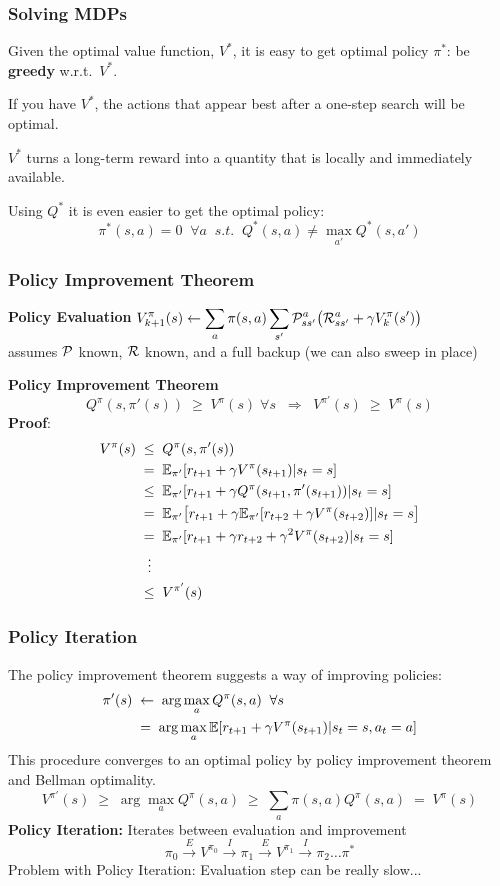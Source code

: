 \begin{frame}
\frametitle{Solving MDPs}

Given the optimal value function, $V^*$, it is easy to get optimal
policy $\pi^*$: be {\bf greedy} w.r.t.\ $V^*$.

If you have $V^*$, the actions that appear best after a  one-step
search will be optimal.

$V^*$ turns a long-term reward into a quantity that is locally and
immediately available.

Using $Q^*$ it is even easier to get the optimal policy:
\[
\pi^*(s,a) = 0 \;\; \forall a \;\; s.t. \;\; Q^*(s,a) \neq \max_{a'} Q^*(s,a')
\]
\end{frame}

\begin{frame}
\frametitle{Policy Improvement Theorem}

{\bf Policy Evaluation} \hfill $ \displaystyle
V_{k+1}^\pi(s) \leftarrow \sum_a \pi(s,a) \sum_{s'} {\mathcal P}_{ss'}^a
\big({\mathcal R}_{ss'}^a + \gamma V_k^\pi(s') \big)$ \hfill\\
assumes ${\mathcal P}$ known, ${\mathcal R}$ known, and a full backup (we can also sweep in
place) \vspace{0.2in}

{\bf Policy Improvement Theorem}
\[
Q^\pi(s,\pi'(s))\;\ge\;V^\pi(s)\;\forall s\;\;\Longrightarrow\;\;V^{\pi'}(s)
\;\ge\;V^{\pi}(s) 
\]
{\bf Proof}: 
\vspace*{-3ex}
\[
\begin{split} 
V^{\pi}(s)\;&\le\;Q^\pi(s,\pi'(s))\\
&=\;\mathbb{E}_{\pi'}[r_{t+1} + \gamma V^\pi(s_{t+1})|s_t=s]\\
&\le\;\mathbb{E}_{\pi'}[r_{t+1} + \gamma Q^\pi(s_{t+1},\pi'(s_{t+1}))|s_t=s]\\
&=\;\mathbb{E}_{\pi'}\big[r_{t+1} + \gamma \mathbb{E}_{\pi'}[r_{t+2}+\gamma V^{\pi}(s_{t+2})]|s_t=s\big]\\
&=\;\mathbb{E}_{\pi'}[r_{t+1} + \gamma r_{t+2}+\gamma^2V^{\pi}(s_{t+2})|s_t=s]\\
&\;\;\vdots\\
&\le\;V^{\pi'}(s)
\end{split}
\]
\end{frame}

\begin{frame}
\frametitle{Policy Iteration}

The policy improvement theorem suggests a way of improving policies:
\[
\begin{split}
\pi'(s)\;&\leftarrow\;\arg \max_a Q^\pi(s,a) \;\; \forall s\\
&=\;\arg \max_a \mathbb{E}[r_{t+1} + \gamma V^\pi(s_{t+1})|s_t=s,a_t=a]
\end{split}
\]
This procedure converges to an optimal policy by policy improvement
theorem and Bellman optimality.
\[
V^{\pi'}(s)\;\ge\;\arg \max_a Q^{\pi}(s,a)\;\ge\;\sum_a \pi(s,a)
Q^{\pi}(s,a)\;=\;V^{\pi}(s)
\]
{\bf Policy Iteration:} Iterates between evaluation and improvement
\[
\pi_0 \stackrel{E}{\longrightarrow} 
V^{\pi_0} \stackrel{I}{\longrightarrow} 
\pi_1 \stackrel{E}{\longrightarrow} 
V^{\pi_1} \stackrel{I}{\longrightarrow} 
\pi_2 \ldots \pi^*
\]
Problem with Policy Iteration: Evaluation step can be really slow...
\end{frame}

